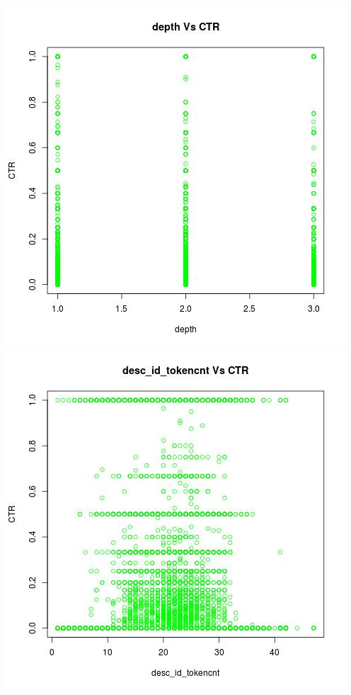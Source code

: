 \documentclass[10pt]{article}
\begin{document}
\includegraphics[scale=0.5]{depth_Vs_CTR}
\includegraphics[scale=0.5]{desc_id_tokencnt_Vs_CTR}\\\\
\end{document}
